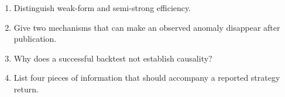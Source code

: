 \begin{exerciseblock}
\begin{enumerate}
  \item Distinguish weak-form and semi-strong efficiency.
  \item Give two mechanisms that can make an observed anomaly disappear after publication.
  \item Why does a successful backtest not establish causality?
  \item List four pieces of information that should accompany a reported strategy return.
\end{enumerate}
\end{exerciseblock}

